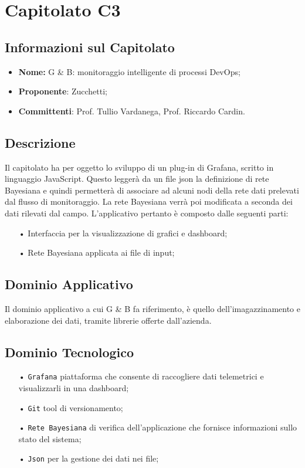 \section{Capitolato C3}
\subsection{Informazioni sul Capitolato}
\begin{itemize}
	\item \textbf{Nome:}  G \& B: monitoraggio intelligente di processi DevOps;
	\item \textbf{Proponente}: Zucchetti;
	\item \textbf{Committenti}: Prof. Tullio Vardanega, Prof. Riccardo Cardin.
\end{itemize}

\subsection{Descrizione}
Il capitolato ha per oggetto lo sviluppo di un plug-in di Grafana, scritto in linguaggio JavaScript. Questo leggerà da un file json la definizione di rete Bayesiana e quindi permetterà di associare ad alcuni nodi della rete dati prelevati dal flusso di monitoraggio.
La rete Bayesiana verrà poi  modificata a seconda dei dati rilevati dal campo. 
L'applicativo pertanto è composto dalle seguenti parti: 

\begin{itemize}

\item[•] Interfaccia per la visualizzazione di grafici e dashboard;
\item[•] Rete Bayesiana applicata ai file di input;

\end{itemize}

\subsection{Dominio Applicativo}
Il dominio applicativo a cui G \& B fa riferimento, è quello dell'imagazzinamento e elaborazione dei dati, tramite librerie offerte dall'azienda. 

\subsection{Dominio Tecnologico}
\begin{itemize}

\item[•] \texttt{Grafana} piattaforma che consente di raccogliere dati telemetrici e visualizzarli in una dashboard;
\item[•] \texttt{Git} tool di versionamento;
\item[•] \texttt{Rete Bayesiana} di verifica dell'applicazione che fornisce informazioni sullo stato del sistema;
\item[•] \texttt{Json} per la gestione dei dati nei file;

\end{itemize}

